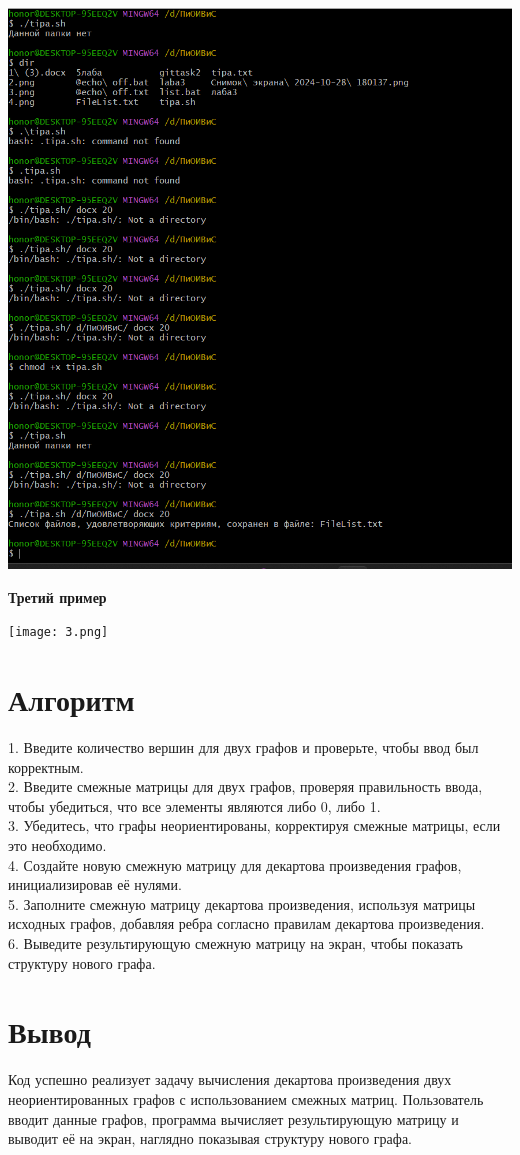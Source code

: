 \documentclass[a4paper,12pt]{article}
\begin{document}
 \includegraphics[width=0.9\columnwidth]{2.png}
  \item \textbf{Третий пример}
  \setlength{\parskip}{0.2cm}
  
 \texttt{[image: 3.png]}
\section*{Алгоритм}
1. Введите количество вершин для двух графов и проверьте, чтобы ввод был корректным. \\
2. Введите смежные матрицы для двух графов, проверяя правильность ввода, чтобы убедиться, что все элементы являются либо 0, либо 1. \\
3. Убедитесь, что графы неориентированы, корректируя смежные матрицы, если это необходимо. \\
4. Создайте новую смежную матрицу для декартова произведения графов, инициализировав её нулями. \\ 
5. Заполните смежную матрицу декартова произведения, используя матрицы исходных графов, добавляя ребра согласно правилам декартова произведения. \\
6. Выведите результирующую смежную матрицу на экран, чтобы показать структуру нового графа.

\section*{Вывод}
Код успешно реализует задачу вычисления декартова произведения двух неориентированных графов с использованием смежных матриц. Пользователь вводит данные графов, программа вычисляет результирующую матрицу и выводит её на экран, наглядно показывая структуру нового графа.
\end{document}
